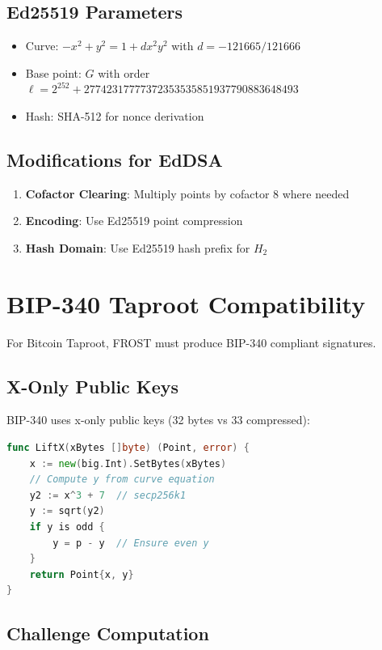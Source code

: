 \documentclass[11pt,a4paper]{article}
\theoremstyle{definition}
\begin{document}
\subsection{Ed25519 Parameters}

\begin{itemize}
\item Curve: $-x^2 + y^2 = 1 + dx^2y^2$ with $d = -121665/121666$
\item Base point: $G$ with order $\ell = 2^{252} + 27742317777372353535851937790883648493$
\item Hash: SHA-512 for nonce derivation
\end{itemize}

\subsection{Modifications for EdDSA}

\begin{enumerate}
\item \textbf{Cofactor Clearing}: Multiply points by cofactor 8 where needed
\item \textbf{Encoding}: Use Ed25519 point compression
\item \textbf{Hash Domain}: Use Ed25519 hash prefix for $H_2$
\end{enumerate}

\section{BIP-340 Taproot Compatibility}

For Bitcoin Taproot, FROST must produce BIP-340 compliant signatures.

\subsection{X-Only Public Keys}

BIP-340 uses x-only public keys (32 bytes vs 33 compressed):

\begin{lstlisting}[language=Go]
func LiftX(xBytes []byte) (Point, error) {
    x := new(big.Int).SetBytes(xBytes)
    // Compute y from curve equation
    y2 := x^3 + 7  // secp256k1
    y := sqrt(y2)
    if y is odd {
        y = p - y  // Ensure even y
    }
    return Point{x, y}
}
\end{lstlisting}

\subsection{Challenge Computation}
\end{document}

